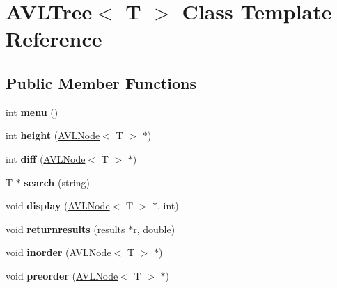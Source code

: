 \hypertarget{classAVLTree}{\section{A\-V\-L\-Tree$<$ T $>$ Class Template Reference}
\label{classAVLTree}
}
\subsection*{Public Member Functions}
\begin{DoxyCompactItemize}
\item 
\hypertarget{classAVLTree_afad352aef6dfa0396957c081c75b887f}{int {\bfseries menu} ()}\label{classAVLTree_afad352aef6dfa0396957c081c75b887f}

\item 
\hypertarget{classAVLTree_a70dad8141f61e3195ea0e85eccc16194}{int {\bfseries height} (\hyperlink{classAVLNode}{A\-V\-L\-Node}$<$ T $>$ $\ast$)}\label{classAVLTree_a70dad8141f61e3195ea0e85eccc16194}

\item 
\hypertarget{classAVLTree_a9c0f19d452fe661fc638eeea5ca5752a}{int {\bfseries diff} (\hyperlink{classAVLNode}{A\-V\-L\-Node}$<$ T $>$ $\ast$)}\label{classAVLTree_a9c0f19d452fe661fc638eeea5ca5752a}

\item 
\hypertarget{classAVLTree_abebeb742aa2178bd7390558bdf4ac6bc}{T $\ast$ {\bfseries search} (string)}\label{classAVLTree_abebeb742aa2178bd7390558bdf4ac6bc}

\item 
\hypertarget{classAVLTree_aac48935f195043f7d159c6dbc02012ba}{void {\bfseries display} (\hyperlink{classAVLNode}{A\-V\-L\-Node}$<$ T $>$ $\ast$, int)}\label{classAVLTree_aac48935f195043f7d159c6dbc02012ba}

\item 
\hypertarget{classAVLTree_a84b8423e379be5388641c90256f588e5}{void {\bfseries returnresults} (\hyperlink{classresults}{results} $\ast$r, double)}\label{classAVLTree_a84b8423e379be5388641c90256f588e5}

\item 
\hypertarget{classAVLTree_a310ed927a0ba8c258792a50b01a66e1d}{void {\bfseries inorder} (\hyperlink{classAVLNode}{A\-V\-L\-Node}$<$ T $>$ $\ast$)}\label{classAVLTree_a310ed927a0ba8c258792a50b01a66e1d}

\item 
\hypertarget{classAVLTree_a54fc7d6003dfae131064e8838084e635}{void {\bfseries preorder} (\hyperlink{classAVLNode}{A\-V\-L\-Node}$<$ T $>$ $\ast$)}\label{classAVLTree_a54fc7d6003dfae131064e8838084e635}


\end{DoxyCompactItemize}

